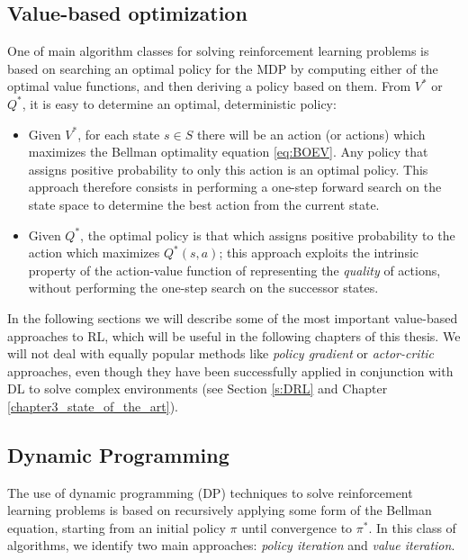 \subsection{Value-based optimization} \label{s:value_based_optimization}
One of main algorithm classes for solving reinforcement learning problems
is based on searching an optimal policy for the MDP by computing either 
of the optimal value functions, and then deriving a policy based on them.
From $V^*$ or $Q^*$, it is easy to determine an optimal, deterministic policy:
\begin{itemize}
    \item Given $V^*$, for each state $s \in S$ there will be an action (or 
    actions) which maximizes the Bellman optimality equation \eqref{eq:BOEV}. 
    Any policy that assigns positive probability to only this action is an 
    optimal policy.
    This approach therefore consists in performing a one-step forward search on 
    the state space to determine the best action from the current state.
    \item Given $Q^*$, the optimal policy is that which assigns positive 
    probability to the action which maximizes $Q^*(s, a)$; this approach 
    exploits the intrinsic property of the action-value function of representing 
    the \textit{quality} of actions, without performing the one-step search 
    on the successor states. 
\end{itemize}

In the following sections we will describe some of the most important value-based 
approaches to RL, which will be useful in the following chapters of this thesis. 
We will not deal with equally popular methods like \textit{policy gradient} or 
\textit{actor-critic} approaches, even though they have been successfully 
applied in conjunction with DL to solve complex environments (see Section 
\ref{s:DRL} and Chapter \ref{chapter3_state_of_the_art}).

\subsection{Dynamic Programming}
The use of dynamic programming (DP) techniques to solve reinforcement learning 
problems is based on recursively applying some form of the Bellman equation, 
starting from an initial policy $\pi$ until convergence to $\pi^*$.
In this class of algorithms, we identify two main approaches: \textit{policy 
iteration} and \textit{value iteration}.

